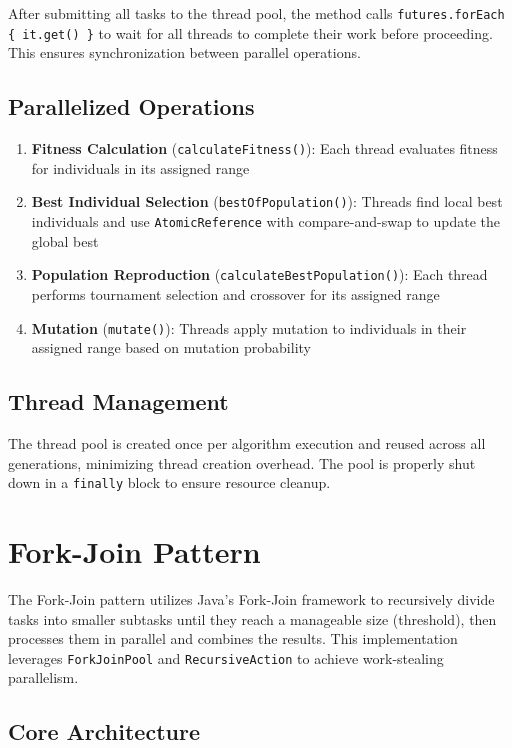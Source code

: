After submitting all tasks to the thread pool, the method calls \texttt{futures.forEach \{ it.get() \}} to wait for all threads to complete their work before proceeding. This ensures synchronization between parallel operations.

\subsection{Parallelized Operations}\label{sec:scatter-gather-operations}

\begin{enumerate}
    \item \textbf{Fitness Calculation} (\texttt{calculateFitness()}): Each thread evaluates fitness for individuals in its assigned range
    \item \textbf{Best Individual Selection} (\texttt{bestOfPopulation()}): Threads find local best individuals and use \texttt{AtomicReference} with compare-and-swap to update the global best
    \item \textbf{Population Reproduction} (\texttt{calculateBestPopulation()}): Each thread performs tournament selection and crossover for its assigned range
    \item \textbf{Mutation} (\texttt{mutate()}): Threads apply mutation to individuals in their assigned range based on mutation probability
\end{enumerate}

\subsection{Thread Management}
The thread pool is created once per algorithm execution and reused across all generations, minimizing thread creation overhead. The pool is properly shut down in a \texttt{finally} block to ensure resource cleanup.

\section{Fork-Join Pattern}

The Fork-Join pattern utilizes Java's Fork-Join framework to recursively divide tasks into smaller subtasks until they reach a manageable size (threshold), then processes them in parallel and combines the results. This implementation leverages \texttt{ForkJoinPool} and \texttt{RecursiveAction} to achieve work-stealing parallelism.

\subsection{Core Architecture}

